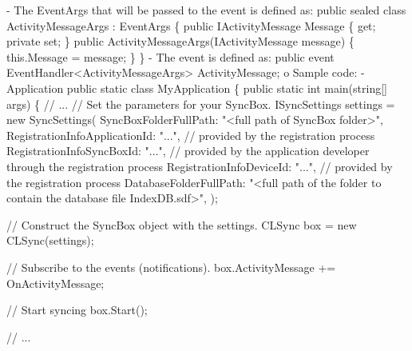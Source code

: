 \begin{DoxyCode}
    - The EventArgs that will be passed to the \textcolor{keyword}{event} is defined as:
          \textcolor{keyword}{public} sealed \textcolor{keyword}{class }ActivityMessageArgs : EventArgs
          \{
              \textcolor{keyword}{public} IActivityMessage Message \{ \textcolor{keyword}{get}; \textcolor{keyword}{private} \textcolor{keyword}{set}; \}
              \textcolor{keyword}{public} ActivityMessageArgs(IActivityMessage message)
              \{
                  this.Message = message;
              \}
          \}
    - The \textcolor{keyword}{event} is defined as:
          \textcolor{keyword}{public} \textcolor{keyword}{event} EventHandler<ActivityMessageArgs> ActivityMessage;
  o Sample code:
    - Application
      \textcolor{keyword}{public} \textcolor{keyword}{static} \textcolor{keyword}{class }MyApplication
      \{
          \textcolor{keyword}{public} \textcolor{keyword}{static} \textcolor{keywordtype}{int} main(\textcolor{keywordtype}{string}[] args)
          \{
              \textcolor{comment}{// ...}
              \textcolor{comment}{// Set the parameters for your SyncBox.}
              ISyncSettings settings = \textcolor{keyword}{new} SyncSettings(
                  SyncBoxFolderFullPath: \textcolor{stringliteral}{"<full path of SyncBox folder>"},
                  RegistrationInfoApplicationId: \textcolor{stringliteral}{"..."},   \textcolor{comment}{// provided by the
       registration process}
                  RegistrationInfoSyncBoxId: \textcolor{stringliteral}{"..."},       \textcolor{comment}{// provided by the
       application developer through the registration process}
                  RegistrationInfoDeviceId: \textcolor{stringliteral}{"..."},        \textcolor{comment}{// provided by the
       registration process}
                  DatabaseFolderFullPath: \textcolor{stringliteral}{"<full path of the folder to contain
       the database file IndexDB.sdf>"},
                   );
        
              \textcolor{comment}{// Construct the SyncBox object with the settings.}
              CLSync box = \textcolor{keyword}{new} CLSync(settings);

              \textcolor{comment}{// Subscribe to the events (notifications).}
              box.ActivityMessage += OnActivityMessage;
    
              \textcolor{comment}{// Start syncing}
              box.Start(); 
    
              \textcolor{comment}{// ...}
    

\end{DoxyCode}
